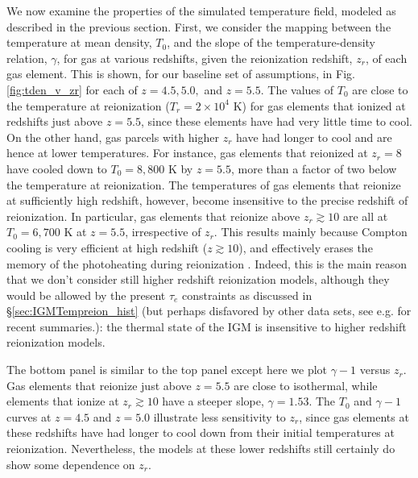 We now examine the properties of the simulated temperature field, modeled as described in the previous section. 
First, we consider the mapping between the temperature at mean density, $T_0$, and the slope of the temperature-density
relation, $\gamma$, for gas at various redshifts, given the reionization redshift, $z_r$, of each gas element. This
is shown, for our baseline set of assumptions, in Fig. \ref{fig:tden_v_zr} for each of $z=4.5,5.0,$ and $z=5.5$.
The values of $T_0$ are close to the temperature at reionization ($T_r = 2 \times 10^4$ K) for gas elements that ionized at redshifts
just above $z=5.5$, since these elements have had very little time to cool. On the other hand, gas parcels with higher $z_r$ have had longer to cool
and are hence at lower temperatures. For instance, gas elements that reionized at $z_r = 8$ have cooled down to $T_0 = 8,800$ K by
$z = 5.5$, more than a factor of two below the temperature at reionization. The temperatures of gas elements that reionize at sufficiently
high redshift, however, become insensitive to the precise redshift of reionization. In particular, gas elements that
reionize above $z_r \gtrsim 10$ are all at $T_0 = 6,700$ K at $z=5.5$, irrespective of $z_r$. This results mainly
because Compton cooling is very efficient at high redshift ($z \gtrsim 10$), and effectively erases the 
memory of the photoheating during
reionization \citep{Hui:1997dp}. Indeed, this is the main reason that we don't consider still higher redshift reionization
models, although they would be allowed by the present $\tau_e$ constraints as discussed in \S \ref{sec:IGMTempreion_hist} (but perhaps disfavored by other data sets, see e.g. \citealt{Robertson:2013bq,Kuhlen:2012vy} for recent summaries.): 
the thermal state of the IGM is insensitive to higher redshift reionization models.

The bottom panel is similar to the top panel
except here we plot $\gamma-1$ versus $z_r$. Gas elements that reionize just above $z = 5.5$ are close to isothermal, while
elements that ionize at $z_r \gtrsim 10$ have a steeper slope, $\gamma = 1.53$. The $T_0$ and $\gamma-1$ curves at $z=4.5$ and $z=5.0$ illustrate
less sensitivity to $z_r$, since gas elements at these redshifts have had longer to cool down from their initial
temperatures at reionization. Nevertheless, the models at these lower redshifts still certainly do show some 
dependence on $z_r$. 

